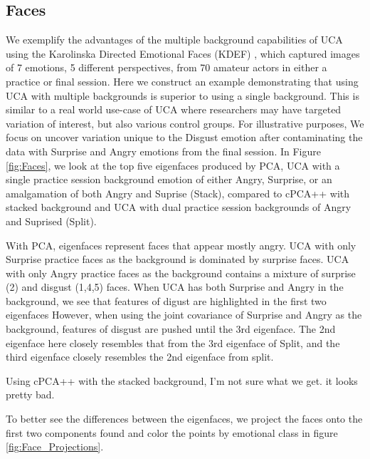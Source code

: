 \documentclass[12pt]{article}
\begin{document}
\subsection{Faces}
We exemplify the advantages of the multiple background capabilities of UCA using the Karolinska Directed Emotional Faces (KDEF) \cite{Calvo2008}, which captured images of 7 emotions, 5 different perspectives, from 70 amateur actors in either a practice or final session.
Here we construct an example demonstrating that using UCA with multiple backgrounds is superior to using a single background. 
This is similar to a real world use-case of UCA where researchers may have targeted variation of interest, but also various control groups.
For illustrative purposes, We focus on  uncover variation unique to the Disgust emotion after contaminating the data with Surprise and Angry emotions from the final session.
In Figure \ref{fig:Faces}, we look at the top five eigenfaces produced by PCA, UCA with a single practice session background emotion of either Angry, Surprise, or an amalgamation of both Angry and Suprise (Stack), compared to cPCA++ with stacked background and UCA with dual practice session backgrounds of Angry and Suprised (Split). 


With PCA, eigenfaces represent faces that appear mostly angry.  
UCA with only Surprise practice faces as the background is dominated by surprise faces.
UCA with only Angry practice faces as the background contains a mixture of surprise (2) and disgust (1,4,5) faces.
When UCA has both Surprise and Angry in the background, we see that features of digust are highlighted in the first two eigenfaces
However, when using the joint covariance of Surprise and Angry as the background, features of disgust are pushed until the 3rd eigenface. The 2nd eigenface here closely resembles that from the 3rd eigenface of Split, and the third eigenface closely resembles the 2nd eigenface from split.

Using cPCA++ with the stacked background, I'm not sure what we get. it looks pretty bad.


To better see the differences between the eigenfaces, we project the faces onto the first two components found and color the points by emotional class in figure \ref{fig:Face_Projections}.
\end{document}
